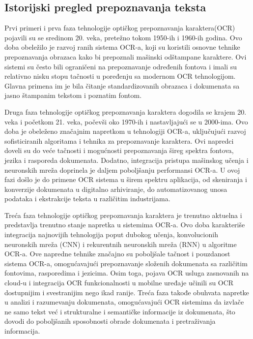 \documentclass[a4paper,12pt]{article}
\begin{document}
	\subsection{Istorijski pregled prepoznavanja teksta}
	
	Prvi primeri i prva faza tehnologije optičkog prepoznavanja karaktera(OCR) pojavili su se sredinom 20. veka, pretežno tokom 1950-ih i 1960-ih godina. Ovo doba obeležilo je razvoj ranih sistema OCR-a, koji su koristili osnovne tehnike prepoznavanja obrazaca kako bi prepoznali mašinski odštampane karaktere. Ovi sistemi su često bili ograničeni na prepoznavanje određenih fontova i imali su relativno nisku stopu tačnosti u poređenju sa modernom OCR tehnologijom. Glavna primena im je bila čitanje standardizovanih obrazaca i dokumenata sa jasno štampanim tekstom i poznatim fontom.
	
	Druga faza tehnologije optičkog prepoznavanja karaktera dogodila se krajem 20. veka i početkom 21. veka, počevši oko 1970-ih i nastavljajući se u 2000-ima. Ovo doba je obeleženo značajnim napretkom u tehnologiji OCR-a, uključujući razvoj sofisticiranih algoritama i tehnika za prepoznavanje karaktera. Ovi napredci doveli su do veće tačnosti i mogućnosti prepoznavanja šireg spektra fontova, jezika i rasporeda dokumenata. Dodatno, integracija pristupa mašinskog učenja i neuronskih mreža doprinela je daljem poboljšanju performansi OCR-a. U ovoj fazi došlo je do primene OCR sistema u širem spektru aplikacija, od skeniranja i konverzije dokumenata u digitalno arhiviranje, do automatizovanog unosa podataka i ekstrakcije teksta u različitim industrijama.
	
	Treća faza tehnologije optičkog prepoznavanja karaktera je trenutno aktuelna i predstavlja trenutno stanje napretka u sistemima OCR-a. Ovo doba karakteriše integracija najnovijih tehnologija poput dubokog učenja, konvolucionih neuronskih mreža (CNN) i rekurentnih neuronskih mreža (RNN) u algoritme OCR-a. Ove napredne tehnike značajno su poboljšale tačnost i pouzdanost sistema OCR-a, omogućavajući prepoznavanje složenih dokumenata sa različitim fontovima, rasporedima i jezicima. Osim toga, pojava OCR usluga zasnovanih na cloud-u i integracija OCR funkcionalnosti u mobilne uređaje učinili su OCR dostupnijim i svestranijim nego ikad ranije. Treća faza takođe obuhvata napretke u analizi i razumevanju dokumenata, omogućavajući OCR sistemima da izvlače ne samo tekst već i strukturalne i semantičke informacije iz dokumenata, što dovodi do poboljšanih sposobnosti obrade dokumenata i pretraživanja informacija.
	
\end{document}
